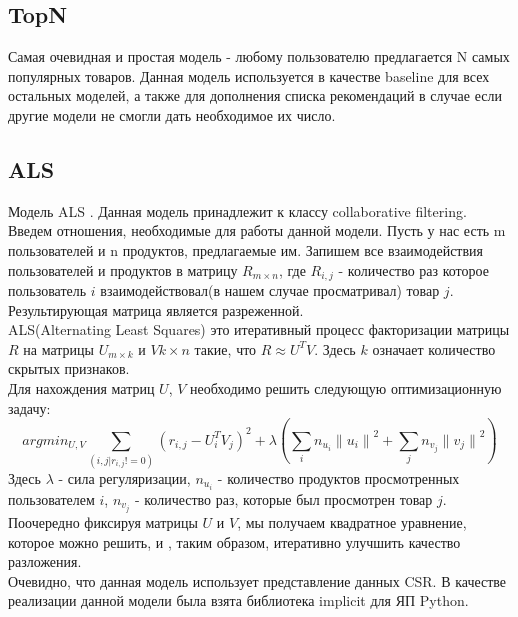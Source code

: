 \documentclass[14pt]{mmcs_article}
\begin{document}
\subsection{TopN}
Самая очевидная и простая модель - любому пользователю предлагается N самых популярных товаров. Данная модель используется в качестве baseline для всех остальных моделей, а также для дополнения списка рекомендаций в случае если другие модели не смогли дать необходимое их число.
\subsection{ALS}
Модель ALS \cite{ALSA1}. Данная модель принадлежит к классу collaborative filtering. \\
Введем отношения, необходимые для работы данной модели. Пусть у нас есть m пользователей и n продуктов, предлагаемые им. Запишем все взаимодействия пользователей и продуктов в матрицу $R_{m \times n}$, где $R_{i,j}$ - количество раз которое пользователь $i$ взаимодействовал(в нашем случае просматривал) товар $j$. Результирующая матрица является разреженной. \\
ALS(Alternating Least Squares) это итеративный процесс факторизации матрицы $R$ на матрицы $U_{m \times k}$ и $V{k \times n}$ такие, что  $R \approx U^TV$. Здесь $k$ означает количество скрытых признаков.\\
Для нахождения матриц $U$, $V$ необходимо решить следующую оптимизационную задачу: 
\begin{equation}
argmin_{U,V} \sum_{(i,j|r_{i,j} != 0)} (r_{i,j} - U_i^TV_j)^2 + \lambda (\sum_i n_{u_i} {\parallel u_i \parallel} ^2 + \sum_j n_{v_j} {\parallel v_j \parallel} ^2) 
\end{equation}
Здесь $\lambda$ - сила регуляризации, $n_{u_i}$ - количество продуктов просмотренных пользователем $i$,  $n_{v_j}$ - количество раз, которые был просмотрен товар $j$. \\
Поочередно фиксируя матрицы $U$ и $V$, мы получаем квадратное уравнение, которое можно решить, и , таким образом, итеративно улучшить качество разложения. \\
Очевидно, что данная модель использует представление данных CSR. В качестве реализации данной модели была взята библиотека implicit \cite{ALSA2} для ЯП Python.
\\

\end{document}
